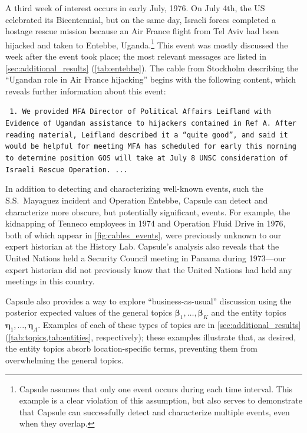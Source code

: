 A third week of interest occurs in early July, 1976.  On July 4th, the
US celebrated its Bicentennial, but on the same day, Israeli forces
completed a hostage rescue mission because an Air France flight from
Tel Aviv had been hijacked and taken to Entebbe,
Uganda.\footnote{Capsule assumes that only one event occurs during
  each time interval. This example is a clear violation of this
  assumption, but also serves to demonstrate that Capsule can
  successfully detect and characterize multiple events, even when they
  overlap.} This event was mostly discussed the week after the event
took place; the most relevant messages are listed in
\cref{sec:additional_results} (\cref{tab:entebbe}). The cable from
Stockholm describing the ``Ugandan role in Air France hijacking''
begins with the following content, which reveals further information
about this event:
\begin{shaded*} \tt{
1. We provided MFA Director of Political Affairs
Leifland with Evidence of Ugandan assistance to
hijackers contained in Ref A.  After reading material,{}
Leifland described it a ``quite good'', and said it{}
would be helpful for meeting MFA has scheduled for
early this morning to determine position GOS will take
at July 8 UNSC consideration of Israeli Rescue Operation. ...
}
\end{shaded*}

In addition to detecting and characterizing well-known events, such
the S.S.~Mayaguez incident and Operation Entebbe, Capsule can detect
and characterize more obscure, but potentially significant,
events. For example, the kidnapping of Tenneco employees in 1974 and
Operation Fluid Drive in 1976, both of which appear in
\cref{fig:cables_events}, were previously unknown to our expert
historian at the History Lab. Capsule's analysis also reveals that
the United Nations held a Security Council meeting in Panama during
1973---our expert historian did not previously know that the United
Nations had held any meetings in this country.

Capsule also provides a way to explore ``business-as-usual''
discussion using the posterior expected values of the general topics
$\mathbold{\beta}_1, \ldots, \mathbold{\beta}_K$ and the entity topics
$\mathbold{\eta}_1, \ldots, \mathbold{\eta}_A$. Examples of each of
these types of topics are in \cref{sec:additional_results}
(\cref{tab:topics,tab:entities}, respectively); these examples
illustrate that, as desired, the entity topics absorb
location-specific terms, preventing them from overwhelming the general
topics.

